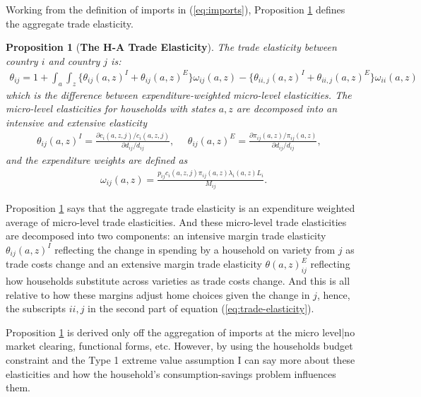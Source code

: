 \documentclass[12pt,pdftex]{article}
\newtheorem{prp}{Proposition}
\begin{document}
\begin{onehalfspacing}
Working from the definition of imports in (\ref{eq:imports}), Proposition \ref{prp:GET} defines the aggregate trade elasticity.
\begin{prp}[\textbf{The H-A Trade Elasticity}] \label{prp:GET} The trade elasticity between country $i$ and country $j$ is:
{\footnotesize
\begin{align}
\theta_{ij} = 1 + \int_{a} \int_{z} \bigg \{ \theta_{ij}(a,z)^{I} + \theta_{ij}(a,z)^{E} \bigg \}\omega_{ij}(a,z) - \bigg \{ \theta_{ii,j}(a,z)^{I} + \theta_{ii,j}(a,z)^{E} \bigg \}\omega_{ii}(a,z)
\label{eq:trade-elasticity}
\end{align}
}which is the difference between expenditure-weighted micro-level elasticities. The micro-level elasticities for households with states $a,z$ are decomposed into an intensive and extensive elasticity
{\footnotesize
\begin{align}
\nonumber
\theta_{ij}(a,z)^{I} = \frac{\partial c_{i}(a,z,j)/ c_{i}(a,z,j)}{\partial d_{ij} / d_{ij}}, \ \ \ \ \ \ \theta_{ij}(a,z)^{E} = \frac{\partial \pi_{ij}(a,z) / \pi_{ij}(a,z)}{\partial d_{ij} / d_{ij}}, \ \ \ \
\end{align}
}
and the expenditure weights are defined as
{\footnotesize
\begin{align}
\nonumber
\omega_{ij}(a,z) = \frac{p_{ij}c_{i}(a,z,j)\pi_{ij}(a,z) \lambda_{i}(a,z) L_i}{M_{ij}}.
\end{align}
}
\end{prp}
Proposition \ref{prp:GET} says that the aggregate trade elasticity is an expenditure weighted average of micro-level trade elasticities. And these micro-level trade elasticities are decomposed into two components: an intensive margin trade elasticity $\theta_{ij}(a,z)^{I}$ reflecting the change in spending by a household on variety from $j$ as trade costs change and an extensive margin trade elasticity $\theta(a,z)_{ij}^{E}$ reflecting how households substitute across varieties as trade costs change. And this is all relative to how these margins adjust home choices given the change in $j$, hence, the subscripts $ii,j$ in the second part of equation (\ref{eq:trade-elasticity}).

Proposition \ref{prp:GET} is derived only off the aggregation of imports at the micro level|no market clearing, functional forms, etc. However, by using the households budget constraint and the Type 1 extreme value assumption I can say more about these elasticities and how the household's consumption-savings problem influences them.


\end{onehalfspacing}
\end{document}
